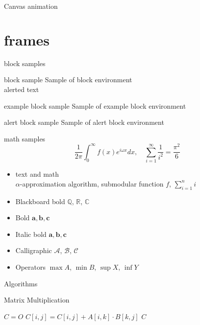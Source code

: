 \documentclass[aspectratio=169]{beamer}
\begin{document}
\begin{frame}{Canvas animation}
  \centering
\end{frame}

\section{frames}
\begin{frame}{block samples}
    \begin{block}{block sample}
        Sample of block environment\\
        \alert{alerted text}
    \end{block} 
    \vfill
    \begin{exampleblock}{example block sample}
        Sample of example block environment
    \end{exampleblock} 
    \vfill
    \begin{alertblock}{alert block sample}
        Sample of alert block environment
    \end{alertblock} 
\end{frame}

\begin{frame}{math samples}
    \[
       \frac{1}{2\pi} \int_0^\infty f(x)e^{i\omega x} dx, \quad
       \sum_{i=1}^\infty \frac{1}{i^2} = \frac{\pi^2}{6}
    \]

    \begin{itemize}
        \item text and math \\ 
         $\alpha$-approximation algorithm, submodular function $f$, $\sum_{i=1}^n i$
        \item Blackboard bold $\mathbb{Q}$, $\mathbb{R}$, $\mathbb{C}$
        \item Bold $\mathbf{a}, \mathbf{b}, \mathbf{c}$
        \item Italic bold $\boldsymbol{a}, \boldsymbol{b}, \boldsymbol{c}$
        \item Calligraphic $\mathcal{A}$, $\mathcal{B}$, $\mathcal{C}$
        \item Operators $\max A$, $\min B$, $\sup X$, $\inf Y$
    \end{itemize}
\end{frame}

\begin{frame}{Algorithms}
    \begin{block}{Matrix Multiplication}
        \begin{algorithmic}[1]
            \STATE $C = O$
            \STATE $C[i,j] = C[i,j] + A[i, k] \cdot B[k, j]$
            \ENDFOR
            \ENDFOR
            \ENDFOR
            \RETURN $C$
        \end{algorithmic}
    \end{block}
\end{frame}
\end{document}
